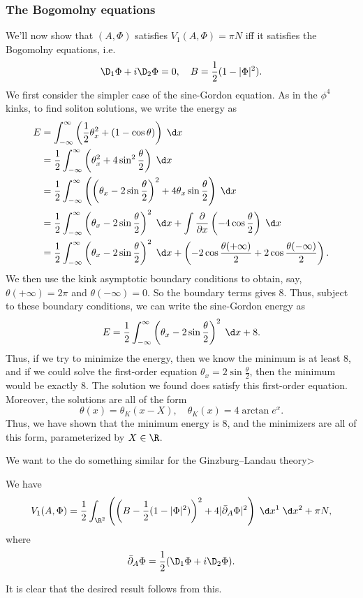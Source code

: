 \documentclass[a4paper]{article}
\begin{document}
\subsubsection*{The Bogomolny equations}
We'll now show that $(A, \Phi)$ satisfies $V_1(A, \Phi) = \pi N$ iff it satisfies the Bogomolny equations, i.e.
\[
  \D_1 \Phi + i \D_2 \Phi = 0,\quad B = \frac{1}{2} (1 - |\Phi|^2).
\]
We first consider the simpler case of the sine-Gordon equation. As in the $\phi^4$ kinks, to find soliton solutions, we write the energy as
\begin{align*}
  E &= \int_{-\infty}^\infty \left(\frac{1}{2} \theta_x^2 + (1 - \cos \theta)\right) \;\d x \\
  &= \frac{1}{2} \int_{-\infty}^\infty \left(\theta_x^2 + 4 \sin^2 \frac{\theta}{2}\right) \;\d x\\
  &= \frac{1}{2} \int_{-\infty}^\infty \left(\left(\theta_x - 2 \sin \frac{\theta}{2}\right)^2 + 4 \theta_x \sin \frac{\theta}{2}\right)\;\d x\\
  &= \frac{1}{2} \int_{-\infty}^\infty \left(\theta_x - 2 \sin \frac{\theta}{2}\right)^2\;\d x + \int \frac{\partial}{\partial x}\left(-4 \cos \frac{\theta}{2}\right)\;\d x\\
  &= \frac{1}{2}\int_{-\infty}^\infty \left(\theta_x - 2 \sin \frac{\theta}{2}\right)^2\;\d x + \left(-2\cos \frac{\theta(+\infty)}{2} + 2 \cos \frac{\theta(-\infty)}{2}\right).
\end{align*}
We then use the kink asymptotic boundary conditions to obtain, say, $\theta(+\infty) = 2\pi$ and $\theta(-\infty) = 0$. So the boundary terms gives $8$. Thus, subject to these boundary conditions, we can write the sine-Gordon energy as
\[
  E = \frac{1}{2}\int_{-\infty}^\infty \left(\theta_x - 2 \sin \frac{\theta}{2}\right)^2\;\d x + 8.
\]
Thus, if we try to minimize the energy, then we know the minimum is at least $8$, and if we could solve the first-order equation $\theta_x = 2 \sin \frac{\theta}{2}$, then the minimum would be exactly $8$. The solution we found does satisfy this first-order equation. Moreover, the solutions are all of the form
\[
  \theta(x) = \theta_K(x - X),\quad \theta_K(x) = 4 \arctan e^x.
\]
Thus, we have shown that the minimum energy is $8$, and the minimizers are all of this form, parameterized by $X \in \R$.

We want to the do something similar for the Ginzburg--Landau theory>
\begin{lemma}
  We have
  \[
    V_1(A, \Phi) = \frac{1}{2} \int_{\R^2} \left(\left(B - \frac{1}{2}(1 - |\Phi|^2)\right)^2 + 4 |\bar{\partial}_A \Phi|^2\right)\;\d x^1\;\d x^2 + \pi N,
  \]
  where
  \[
    \bar{\partial}_A \Phi = \frac{1}{2} (\D_1 \Phi + i \D_2 \Phi).
  \]
\end{lemma}
It is clear that the desired result follows from this.
\end{document}
